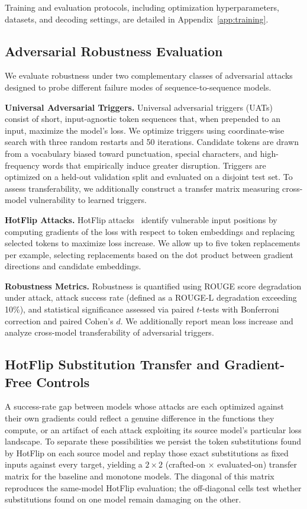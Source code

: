 \documentclass{article}
\theoremstyle{plain}
\theoremstyle{definition}
\theoremstyle{remark}
\begin{document}
Training and evaluation protocols, including optimization hyperparameters, datasets, and decoding settings, are detailed in Appendix~\ref{app:training}.

\subsection{Adversarial Robustness Evaluation}
We evaluate robustness under two complementary classes of adversarial attacks designed to probe different failure modes of sequence-to-sequence models.

\textbf{Universal Adversarial Triggers.}
Universal adversarial triggers (UATs)~\cite{wallace2019universal} consist of short, input-agnostic token sequences that, when prepended to an input, maximize the model’s loss. We optimize triggers using coordinate-wise search with three random restarts and 50 iterations. Candidate tokens are drawn from a vocabulary biased toward punctuation, special characters, and high-frequency words that empirically induce greater disruption. Triggers are optimized on a held-out validation split and evaluated on a disjoint test set. To assess transferability, we additionally construct a transfer matrix measuring cross-model vulnerability to learned triggers.

\textbf{HotFlip Attacks.}
HotFlip attacks~\cite{ebrahimi2018hotflip} identify vulnerable input positions by computing gradients of the loss with respect to token embeddings and replacing selected tokens to maximize loss increase. We allow up to five token replacements per example, selecting replacements based on the dot product between gradient directions and candidate embeddings.

\textbf{Robustness Metrics.}
Robustness is quantified using ROUGE score degradation under attack, attack success rate (defined as a ROUGE-L degradation exceeding 10\%), and statistical significance assessed via paired $t$-tests with Bonferroni correction and paired Cohen's $d$. We additionally report mean loss increase and analyze cross-model transferability of adversarial triggers.

\subsection{HotFlip Substitution Transfer and Gradient-Free Controls}
\label{sec:hotflip-transfer-setup}
A success-rate gap between models whose attacks are each optimized against their own gradients could reflect a genuine difference in the functions they compute, or an artifact of each attack exploiting its source model's particular loss landscape. To separate these possibilities we persist the token substitutions found by HotFlip on each source model and replay those exact substitutions as fixed inputs against every target, yielding a $2\times 2$ (crafted-on $\times$ evaluated-on) transfer matrix for the baseline and monotone models. The diagonal of this matrix reproduces the same-model HotFlip evaluation; the off-diagonal cells test whether substitutions found on one model remain damaging on the other.
\end{document}
